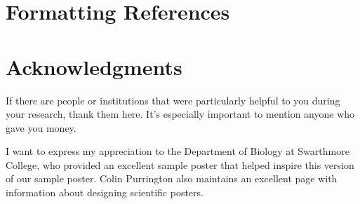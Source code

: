 \documentclass[thesis]{hmcposter}
\begin{document}
\begin{poster}
\section{Formatting References}



\vfill

\section{Acknowledgments}

If there are people or institutions that were particularly helpful
to you during your research, thank them here.  It's especially
important to mention anyone who gave you money.

I want to express my appreciation to the Department of Biology at
Swarthmore College, who provided an excellent sample poster
\citep{swarthmore-poster} that helped inspire this version of our
sample poster.  Colin Purrington also maintains an excellent page
with information about designing scientific
posters. \citeyearpar{purrington-sciposters}

\vfill
\end{poster}
\end{document}

